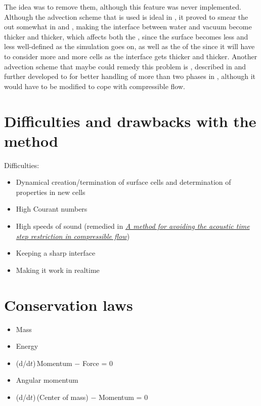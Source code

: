 The idea was to remove them, although this feature was never implemented. Although the advection scheme that is used is ideal in , it proved to smear the  out somewhat in  and , making the interface between water and vacuum become thicker and thicker, which affects both the , since the surface becomes less and less well-defined as the simulation goes on, as well as the \preformance of the  since it will have to consider more and more cells as the interface gets thicker and thicker. Another advection scheme that maybe could remedy this problem is \MULES, described in \citep{Berberovi2009} and further developed to for better handling of more than two phases in \citep{Kissling2010}, although it would have to be modified to cope with compressible flow.

\section{Difficulties and drawbacks with the method}

Difficulties:
\begin{itemize}
    \item Dynamical creation/termination of surface cells and determination of properties in new cells
    \item High Courant numbers
    \item High speeds of sound (remedied in \textit{\href{http://physbam.stanford.edu/~kwatra/papers/compressible_semi_implicit/compressible_semi_implicit.pdf}{A method for avoiding the acoustic time step restriction in compressible flow}})
    \item Keeping a sharp interface
    \item Making it work in realtime
\end{itemize}

\section{Conservation laws}

\begin{itemize}
    \item Mass
    \item Energy
    \item (d/d$t$)\,Momentum $-$ Force = 0
    \item Angular momentum
    \item (d/d$t$)\,(Center of mass) $-$ Momentum = 0
\end{itemize}

